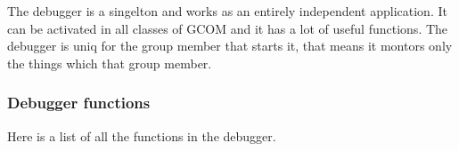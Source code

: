 \documentclass[titlepage, twocolumn, a4paper, 10pt]{article}
\begin{document}

The debugger is a singelton and works as an entirely independent
application. It can be activated in all classes of GCOM and it has a
lot of useful functions. The debugger is uniq for the group member
that starts it, that means it montors only the things which that group
member.

\subsubsection{Debugger functions}\label{sec:debuggerfunctions}
Here is a list of all the functions in the debugger.
\end{document}
